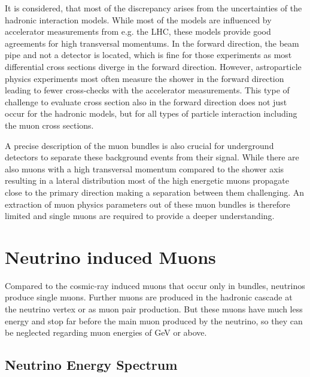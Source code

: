 It is considered, that most of the discrepancy arises from the uncertainties of the hadronic interaction models.
While most of the models are influenced by accelerator measurements from e.g. the LHC, these models provide good agreements for high transversal momentums.
In the forward direction, the beam pipe and not a detector is located, which is fine for those experiments as most differential cross sections diverge in the forward direction.
However, astroparticle physics experiments most often measure the shower in the forward direction leading to fewer cross-checks with the accelerator measurements.
This type of challenge to evaluate cross section also in the forward direction does not just occur for the hadronic models, but for all types of particle interaction including the muon cross sections.

A precise description of the muon bundles is also crucial for underground detectors to separate these background events from their signal.
While there are also muons with a high transversal momentum compared to the shower axis resulting in a lateral distribution \cite{Engel11EAS} most of the high energetic muons propagate close to the primary direction making a separation between them challenging.
An extraction of muon physics parameters out of these muon bundles is therefore limited and single muons are required to provide a deeper understanding.

%
% 
%
%

\section{Neutrino induced Muons}

Compared to the cosmic-ray induced muons that occur only in bundles, neutrinos produce single muons.
Further muons are produced in the hadronic cascade at the neutrino vertex or as muon pair production.
But these muons have much less energy and stop far before the main muon produced by the neutrino, so they can be neglected regarding muon energies of GeV or above.

\subsection{Neutrino Energy Spectrum}

